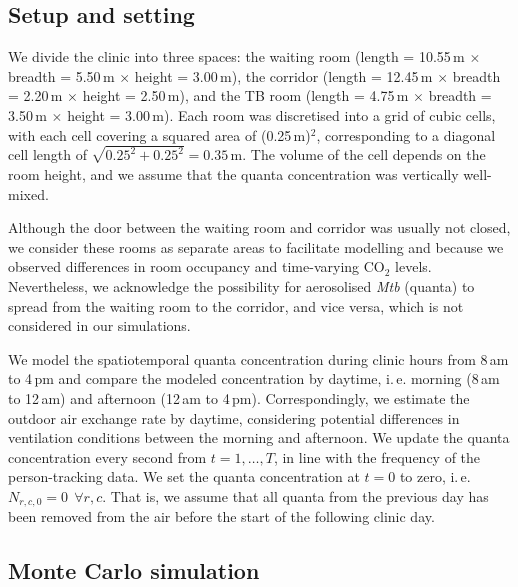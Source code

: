 \documentclass[fleqn,11pt]{wlscirep_supp}
\newcommand\ie{i.\,e.\xspace}
\begin{document}
\subsection{Setup and setting}\label{prep:building}

We divide the clinic into three spaces: the waiting room (length = 10.55\,m $\times$ breadth = 5.50\,m $\times$ height = 3.00\,m), the corridor (length = 12.45\,m $\times$ breadth = 2.20\,m $\times$ height = 2.50\,m), and the TB room (length = 4.75\,m $\times$ breadth = 3.50\,m $\times$ height = 3.00\,m). Each room was discretised into a grid of cubic cells, with each cell covering a squared area of (0.25\,m)$^2$, corresponding to a diagonal cell length of $\sqrt{0.25^2 + 0.25^2} = 0.35$\,m. The volume of the cell depends on the room height, and we assume that the quanta concentration was vertically well-mixed.

Although the door between the waiting room and corridor was usually not closed, we consider these rooms as separate areas to facilitate modelling and because we observed differences in room occupancy and time-varying CO$_2$ levels. Nevertheless, we acknowledge the possibility for aerosolised \emph{Mtb} (quanta) to spread from the waiting room to the corridor, and vice versa, which is not considered in our simulations.  

We model the spatiotemporal quanta concentration during clinic hours from 8\,am to 4\,pm and compare the modeled concentration by daytime, \ie morning (8\,am to 12\,am) and afternoon (12\,am to 4\,pm). Correspondingly, we estimate the outdoor air exchange rate by daytime, considering potential differences in ventilation conditions between the morning and afternoon. We update the quanta concentration every second from $t = 1, \dots, T$, in line with the frequency of the person-tracking data. We set the quanta concentration at $t=0$ to zero, \ie $N_{r,c,0} = 0 ~~ \forall r, c$. That is, we assume that all quanta from the previous day has been removed from the air before the start of the following clinic day. 


\subsection{Monte Carlo simulation}
\end{document}
